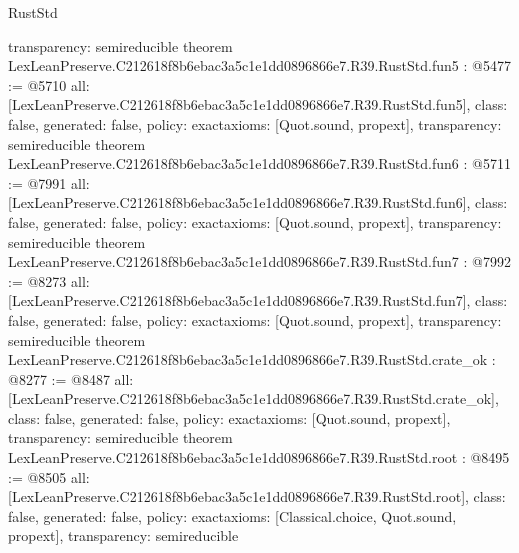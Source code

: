 \begin{lexlean}{RustStd}
\begin{coremodule}
{  transparency: semireducible
}
theorem LexLeanPreserve.C212618f8b6ebac3a5c1e1dd0896866e7.R39.RustStd.fun5 : @5477 := @5710 {
  all: [LexLeanPreserve.C212618f8b6ebac3a5c1e1dd0896866e7.R39.RustStd.fun5],
  class: false,
  generated: false,
  policy: exact{axioms: [Quot.sound, propext]},
  transparency: semireducible
}
theorem LexLeanPreserve.C212618f8b6ebac3a5c1e1dd0896866e7.R39.RustStd.fun6 : @5711 := @7991 {
  all: [LexLeanPreserve.C212618f8b6ebac3a5c1e1dd0896866e7.R39.RustStd.fun6],
  class: false,
  generated: false,
  policy: exact{axioms: [Quot.sound, propext]},
  transparency: semireducible
}
theorem LexLeanPreserve.C212618f8b6ebac3a5c1e1dd0896866e7.R39.RustStd.fun7 : @7992 := @8273 {
  all: [LexLeanPreserve.C212618f8b6ebac3a5c1e1dd0896866e7.R39.RustStd.fun7],
  class: false,
  generated: false,
  policy: exact{axioms: [Quot.sound, propext]},
  transparency: semireducible
}
theorem LexLeanPreserve.C212618f8b6ebac3a5c1e1dd0896866e7.R39.RustStd.crate_ok : @8277 := @8487 {
  all: [LexLeanPreserve.C212618f8b6ebac3a5c1e1dd0896866e7.R39.RustStd.crate_ok],
  class: false,
  generated: false,
  policy: exact{axioms: [Quot.sound, propext]},
  transparency: semireducible
}
theorem LexLeanPreserve.C212618f8b6ebac3a5c1e1dd0896866e7.R39.RustStd.root : @8495 := @8505 {
  all: [LexLeanPreserve.C212618f8b6ebac3a5c1e1dd0896866e7.R39.RustStd.root],
  class: false,
  generated: false,
  policy: exact{axioms: [Classical.choice, Quot.sound, propext]},
  transparency: semireducible
}


\end{coremodule}
\end{lexlean}
